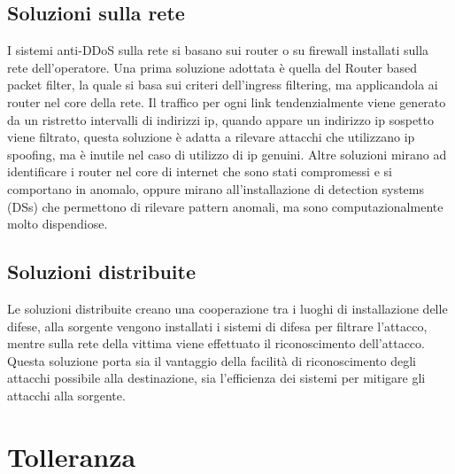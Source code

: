 \subsection{Soluzioni sulla rete}

I sistemi anti-DDoS sulla rete si basano sui router o su firewall installati sulla rete dell'operatore.
Una prima soluzione adottata è quella del Router based packet filter, la quale si basa sui criteri dell'ingress filtering, ma applicandola ai router nel core della rete. Il traffico per ogni link tendenzialmente viene generato da un ristretto intervalli di indirizzi ip, quando appare un indirizzo ip sospetto viene filtrato, questa soluzione è adatta a rilevare attacchi che utilizzano ip spoofing, ma è inutile nel caso di utilizzo di ip genuini.
Altre soluzioni mirano ad identificare i router nel core di internet che sono stati compromessi e si comportano in anomalo, oppure mirano all'installazione di detection systems (DSs) che permettono di rilevare pattern anomali, ma sono computazionalmente molto dispendiose.

\subsection{Soluzioni distribuite}

Le soluzioni distribuite creano una cooperazione tra i luoghi di installazione delle difese, alla sorgente vengono installati i sistemi di difesa per filtrare l'attacco, mentre sulla rete della vittima viene effettuato il riconoscimento dell'attacco. Questa soluzione porta sia il vantaggio della facilità di riconoscimento degli attacchi possibile alla destinazione, sia l'efficienza dei sistemi per mitigare gli attacchi alla sorgente.


\section{Tolleranza}
